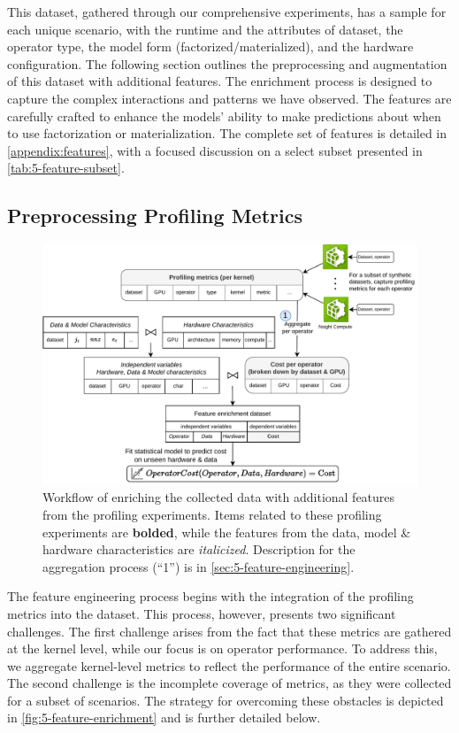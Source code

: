 This dataset, gathered through our comprehensive experiments, has a sample for each unique scenario, with the runtime and the attributes of dataset, the operator type, the model form (factorized/materialized), and the hardware configuration. The following section outlines the preprocessing and augmentation of this dataset with additional features. The enrichment process is designed to capture the complex interactions and patterns we have observed. The features are carefully crafted to enhance the models' ability to make predictions about when to use factorization or materialization. The complete set of features is detailed in \autoref{appendix:features}, with a focused discussion on a select subset presented in \autoref{tab:5-feature-subset}.

\subsection{Preprocessing Profiling Metrics}
\begin{figure}[ht]
    \centering
    \includegraphics[width=\linewidth]{chapters/05_cost_estimation/figures/feature-engineering.pdf}
    \caption[Feature enrichment workflow]{Workflow of enriching the collected data with additional features from the profiling experiments. Items related to these profiling experiments are \textbf{bolded}, while the features from the data, model \& hardware characteristics are \textit{italicized}. Description for the aggregation process (“1”) is in \autoref{sec:5-feature-engineering}.}
    \label{fig:5-feature-enrichment}
\end{figure}
The feature engineering process begins with the integration of the profiling metrics into the dataset. This process, however, presents two significant challenges. The first challenge arises from the fact that these metrics are gathered at the kernel level, while our focus is on operator performance. To address this, we aggregate kernel-level metrics to reflect the performance of the entire scenario. The second challenge is the incomplete coverage of metrics, as they were collected for a subset of scenarios. The strategy for overcoming these obstacles is depicted in \autoref{fig:5-feature-enrichment} and is further detailed below.

